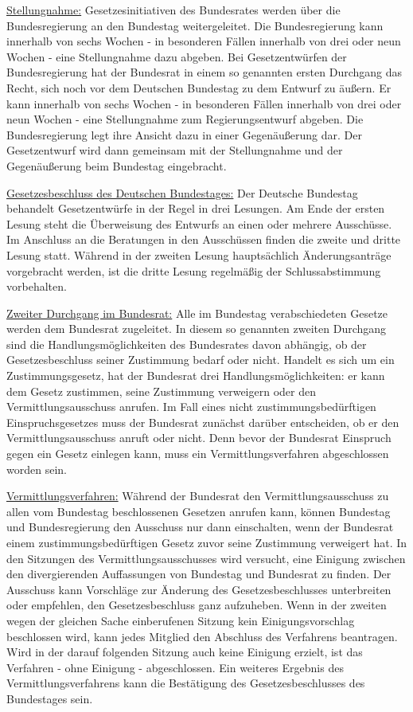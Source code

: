 \documentclass{article}
\begin{document}
\begin{enumerate}[label=(\alph*)]
		\underline{Stellungnahme:} Gesetzesinitiativen des Bundesrates werden über die Bundesregierung an den Bundestag weitergeleitet. Die Bundesregierung kann innerhalb von sechs Wochen - in besonderen Fällen innerhalb von drei oder neun Wochen - eine Stellungnahme dazu abgeben. Bei Gesetzentwürfen der Bundesregierung hat der Bundesrat in einem so genannten ersten Durchgang das Recht, sich noch vor dem Deutschen Bundestag zu dem Entwurf zu äußern. Er kann innerhalb von sechs Wochen - in besonderen Fällen innerhalb von drei oder neun Wochen - eine Stellungnahme zum Regierungsentwurf abgeben. Die Bundesregierung legt ihre Ansicht dazu in einer Gegenäußerung dar. Der Gesetzentwurf wird dann gemeinsam mit der Stellungnahme und der Gegenäußerung beim Bundestag eingebracht.
		
		\underline{Gesetzesbeschluss des Deutschen Bundestages:} Der Deutsche Bundestag behandelt Gesetzentwürfe in der Regel in drei Lesungen. Am Ende der ersten Lesung steht die Überweisung des Entwurfs an einen oder mehrere Ausschüsse. Im Anschluss an die Beratungen in den Ausschüssen finden die zweite und dritte Lesung statt. Während in der zweiten Lesung hauptsächlich Änderungsanträge vorgebracht werden, ist die dritte Lesung regelmäßig der Schlussabstimmung vorbehalten.
		
		\underline{Zweiter Durchgang im Bundesrat:} Alle im Bundestag verabschiedeten Gesetze werden dem Bundesrat zugeleitet. In diesem so genannten zweiten Durchgang sind die Handlungsmöglichkeiten des Bundesrates davon abhängig, ob der Gesetzesbeschluss seiner Zustimmung bedarf oder nicht. Handelt es sich um ein Zustimmungsgesetz, hat der Bundesrat drei Handlungsmöglichkeiten: er kann dem Gesetz zustimmen, seine Zustimmung verweigern oder den Vermittlungsausschuss anrufen. Im Fall eines nicht zustimmungsbedürftigen Einspruchsgesetzes muss der Bundesrat zunächst darüber entscheiden, ob er den Vermittlungsausschuss anruft oder nicht. Denn bevor der Bundesrat Einspruch gegen ein Gesetz einlegen kann, muss ein Vermittlungsverfahren abgeschlossen worden sein.
		
		\underline{Vermittlungsverfahren:} Während der Bundesrat den Vermittlungsausschuss zu allen vom Bundestag beschlossenen Gesetzen anrufen kann, können Bundestag und Bundesregierung den Ausschuss nur dann einschalten, wenn der Bundesrat einem zustimmungsbedürftigen Gesetz zuvor seine Zustimmung verweigert hat. In den Sitzungen des Vermittlungsausschusses wird versucht, eine Einigung zwischen den divergierenden Auffassungen von Bundestag und Bundesrat zu finden. Der Ausschuss kann Vorschläge zur Änderung des Gesetzesbeschlusses unterbreiten oder empfehlen, den Gesetzesbeschluss ganz aufzuheben. Wenn in der zweiten wegen der gleichen Sache einberufenen Sitzung kein Einigungsvorschlag beschlossen wird, kann jedes Mitglied den Abschluss des Verfahrens beantragen. Wird in der darauf folgenden Sitzung auch keine Einigung erzielt, ist das Verfahren - ohne Einigung - abgeschlossen. Ein weiteres Ergebnis des Vermittlungsverfahrens kann die Bestätigung des Gesetzesbeschlusses des Bundestages sein.
		

\end{enumerate}
\end{document}
